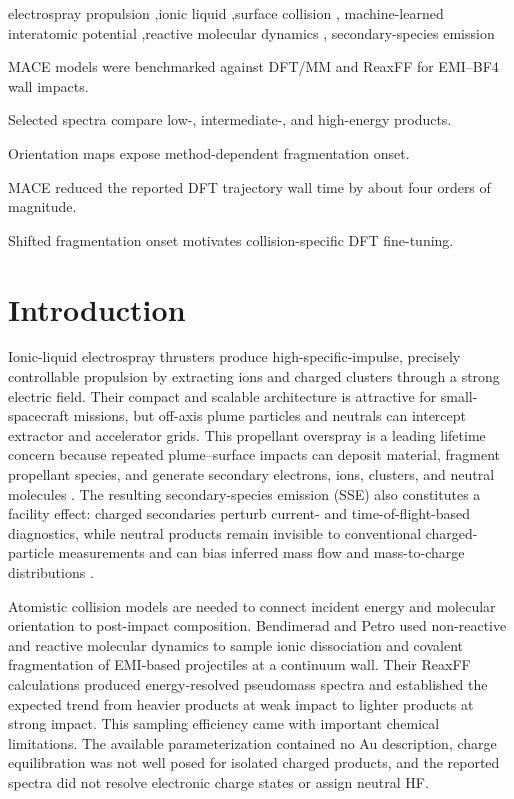 \documentclass[preprint,review,12pt]{elsarticle}
\begin{document}
\begin{frontmatter}
\begin{keyword}
electrospray propulsion \sep ionic liquid \sep surface collision \sep
machine-learned interatomic potential \sep reactive molecular dynamics \sep
secondary-species emission
\end{keyword}

\end{frontmatter}

\begin{highlights}
\item MACE models were benchmarked against DFT/MM and ReaxFF for EMI--BF4 wall impacts.
\item Selected spectra compare low-, intermediate-, and high-energy products.
\item Orientation maps expose method-dependent fragmentation onset.
\item MACE reduced the reported DFT trajectory wall time by about four orders of magnitude.
\item Shifted fragmentation onset motivates collision-specific DFT fine-tuning.
\end{highlights}

\section{Introduction}
\label{sec:introduction}

Ionic-liquid electrospray thrusters produce high-specific-impulse, precisely
controllable propulsion by extracting ions and charged clusters through a
strong electric field. Their compact and scalable architecture is attractive
for small-spacecraft missions, but off-axis plume particles and neutrals can
intercept extractor and accelerator grids. This propellant overspray is a
leading lifetime concern because repeated plume--surface impacts can deposit
material, fragment propellant species, and generate secondary electrons, ions,
clusters, and neutral molecules \cite{Bendimerad2022,Laws2026}. The resulting
secondary-species emission (SSE) also constitutes a facility effect: charged
secondaries perturb current- and time-of-flight-based diagnostics, while
neutral products remain invisible to conventional charged-particle
measurements and can bias inferred mass flow and mass-to-charge distributions
\cite{Laws2026}.

Atomistic collision models are needed to connect incident energy and molecular
orientation to post-impact composition. Bendimerad and Petro
\cite{Bendimerad2022} used non-reactive and reactive molecular dynamics to
sample ionic dissociation and covalent fragmentation of EMI-based projectiles
at a continuum wall. Their ReaxFF calculations produced energy-resolved
pseudomass spectra and established the expected trend from heavier products at
weak impact to lighter products at strong impact. This sampling efficiency
came with important chemical limitations. The available parameterization
contained no Au description, charge equilibration was not well posed for
isolated charged products, and the reported spectra did not resolve electronic
charge states or assign neutral HF.
\end{document}
